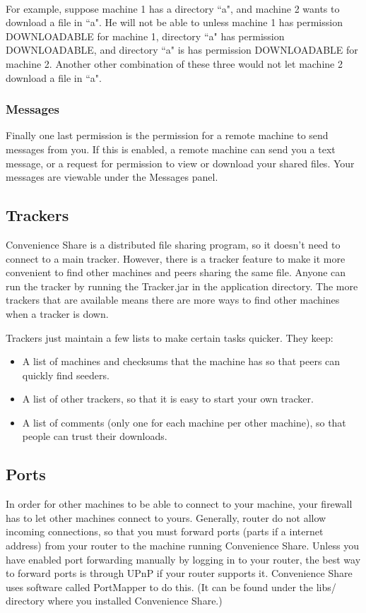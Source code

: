 \documentclass{article}
\begin{document}
\paragraph{}

For example, suppose machine 1 has a directory ``a", and machine 2 wants to download a file in ``a".
He will not be able to unless machine 1 has permission DOWNLOADABLE for machine 1, directory ``a" has permission DOWNLOADABLE, and directory ``a" is has permission DOWNLOADABLE for machine 2. Another other combination of these three would not let machine 2 download a file in ``a".


\subsubsection{Messages}
Finally one last permission is the permission for a remote machine to send messages from you.
If this is enabled, a remote machine can send you a text message, or a request for permission to view or download your shared files.
Your messages are viewable under the Messages panel.


\subsection{Trackers}
Convenience Share is a distributed file sharing program, so it doesn't need to connect to a main tracker.
However, there is a tracker feature to make it more convenient to find other machines and peers sharing the same file.
Anyone can run the tracker by running the Tracker.jar in the application directory.
The more trackers that are available means there are more ways to find other machines when a tracker is down.

Trackers just maintain a few lists to make certain tasks quicker.
They keep:
\begin{itemize}
  \item A list of machines and checksums that the machine has so that peers can quickly find seeders.
  \item A list of other trackers, so that it is easy to start your own tracker.
  \item A list of comments (only one for each machine per other machine), so that people can trust their downloads.
\end{itemize}


\subsection{Ports}
In order for other machines to be able to connect to your machine, your firewall has to let other machines connect to yours.
Generally, router do not allow incoming connections, so that you must forward ports (parts if a internet address) from your router to the machine running Convenience Share.
Unless you have enabled port forwarding manually by logging in to your router, the best way to forward ports is through UPnP if your router supports it.
Convenience Share uses software called PortMapper to do this.
(It can be found under the libs/ directory where you installed Convenience Share.)
\end{document}
